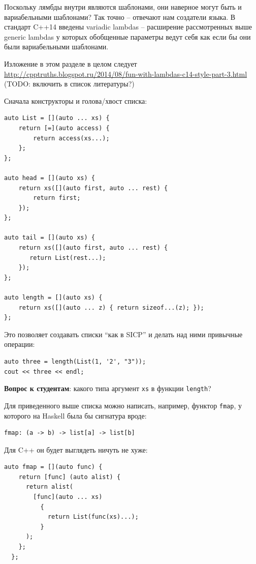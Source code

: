 \documentclass[a4paper,12pt,oneside]{article}
\newif\ifanswers
\begin{document}
Поскольку лямбды внутри являются шаблонами, они наверное могут быть и вариабельными шаблонами? Так точно -- отвечают нам создатели языка. В стандарт C++14 введены variadic lambdas -- расширение рассмотренных выше generic lambdas у которых обобщенные параметры ведут себя как если бы они были вариабельными шаблонами.

Изложение в этом разделе в целом следует \url{http://cpptruths.blogspot.ru/2014/08/fun-with-lambdas-c14-style-part-3.html} (TODO: включить в список литературы?)

Сначала конструкторы и голова/хвост списка:

\begin{lstlisting}
auto List = [](auto ... xs) {
    return [=](auto access) { 
        return access(xs...); 
    };
};

auto head = [](auto xs) {
    return xs([](auto first, auto ... rest) { 
        return first; 
    });
};

auto tail = [](auto xs) {
    return xs([](auto first, auto ... rest) { 
       return List(rest...); 
    });
};

auto length = [](auto xs) {
    return xs([](auto ... z) { return sizeof...(z); });
};
\end{lstlisting}

Это позволяет создавать списки ``как в SICP'' и делать над ними привычные операции:

\begin{lstlisting}
auto three = length(List(1, '2', "3")); 
cout << three << endl;
\end{lstlisting}

\textbf{Вопрос к студентам}: какого типа аргумент \lstinline!xs! в функции \lstinline!length!?

\ifanswers
Правильный ответ: \lstinline!std::function!
\fi

Для приведенного выше списка можно написать, например, функтор \lstinline!fmap!, у которого на Haskell была бы сигнатура вроде:

\begin{verbatim}
fmap: (a -> b) -> list[a] -> list[b]
\end{verbatim}

Для C++ он будет выглядеть ничуть не хуже:

\begin{lstlisting}
auto fmap = [](auto func) {
    return [func] (auto alist) {
      return alist(
        [func](auto ... xs)
          {
            return List(func(xs)...);  
          }
      );
    };
  };
\end{lstlisting}
\end{document}
